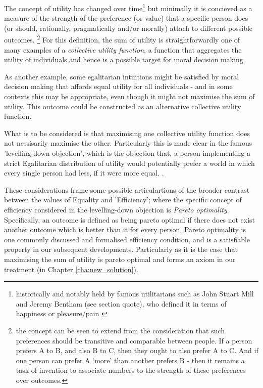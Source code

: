 The concept of utility has changed over time\footnote{historically and notably held by famous utilitarians such as John Stuart Mill\cite{MillGutenberg} and Jeremy Bentham (see section quote), who defined it in terms of happiness or pleasure/pain \cite{bentham1823introduction}}
but minimally it is concieved as a measure of the strength of the preference (or value) that a specific person does (or should, rationally, pragmatically and/or morally) attach to different possible outcomes.%
\footnote{the concept can be seen to extend from the consideration that such preferences should be transitive and comparable between people. If a person prefers A to B, and also B to C, then they ought to also prefer A to C. And if one person can prefer A `more' than another prefers B - then it remains a task of invention to associate numbers to the strength of these preferences over outcomes.}
For this definition, the sum of utility is straightforwardly one of many examples of a \textit{collective utility function}, a function that aggregates the utility of individuals and hence is a possible target for moral decision making.\cite{TheoriesofValueAggregation}

As another example, some egalitarian intuitions might be satisfied by moral decision making that affords equal utility for all individuals - and in some contexts this may be appropriate, even though it might not maximise the sum of utility. This outcome could be constructed as an alternative collective utility function.

What is to be considered is that maximising one collective utility function does not nessisarily maximise the other.
Particularly this is made clear in the famous 'levelling-down objection', which is the objection that, a person implementing a strict Egalitarian distribution of utility would potentially prefer a world in which every single person had less, if it were more equal. \cite{temkin_2003, equalityandpriorityparfit}.

These considerations frame some possible articulartions of the broader contrast between the values of Equality and 'Efficiency'; where the specific concept of efficiency considered in the levelling-down objection is \textit{Pareto optimality}.
Specifically, an outcome is defined as being pareto optimal if there does not exist another outcome which is better than it for every person.
Pareto optimality is one commonly discussed and formalised efficiency condition, and is a satisfiable property in our subsequent developments.
Particularly as it is the case that maximising the sum of utility is pareto optimal \cite{TheoriesofValueAggregation} and forms an axiom in our treatment (in Chapter \ref{cha:new_solution}).

